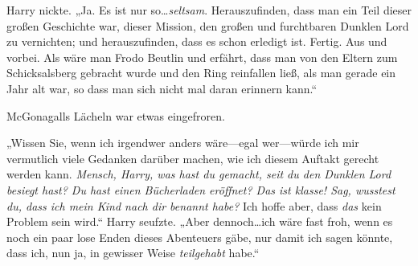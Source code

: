 Harry nickte. „Ja. Es ist nur so…\emph{seltsam}. Herauszufinden, dass man ein Teil dieser großen Geschichte war, dieser Mission, den großen und furchtbaren Dunklen Lord zu vernichten; und herauszufinden, dass es schon erledigt ist. Fertig. Aus und vorbei. Als wäre man Frodo Beutlin und erfährt, dass man von den Eltern zum Schicksalsberg gebracht wurde und den Ring reinfallen ließ, als man gerade ein Jahr alt war, so dass man sich nicht mal daran erinnern kann.“

McGonagalls Lächeln war etwas eingefroren.

„Wissen Sie, wenn ich irgendwer anders wäre—egal wer—würde ich mir vermutlich viele Gedanken darüber machen, wie ich diesem Auftakt gerecht werden kann. \emph{Mensch, Harry, was hast du gemacht, seit du den Dunklen Lord besiegt hast? Du hast einen Bücherladen eröffnet? Das ist klasse! Sag, wusstest du, dass ich mein Kind nach dir benannt habe?} Ich hoffe aber, dass \emph{das} kein Problem sein wird.“ Harry seufzte. „Aber dennoch…ich wäre fast froh, wenn es noch ein paar lose Enden dieses Abenteuers gäbe, nur damit ich sagen könnte, dass ich, nun ja, in gewisser Weise \emph{teilgehabt} habe.“

